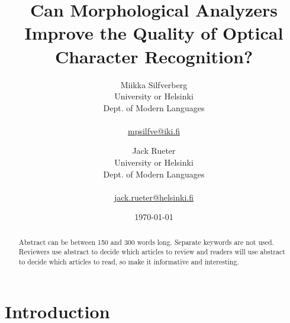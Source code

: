 \documentclass[b5paper]{article}
\begin{document}
\title{Can Morphological Analyzers Improve the Quality of Optical Character Recognition?}

\author{Miikka Silfverberg\\
University or Helsinki\\
Dept. of Modern Languages\\
\\
\url{mpsilfve@iki.fi} \and
Jack Rueter\\
University or Helsinki\\
Dept. of Modern Languages\\
\\
\url{jack.rueter@helsinki.fi} 
}

\date{\today}

\maketitle

\begin{abstract}
    Abstract can be between 150 and 300 words long. Separate keywords are not
    used. Reviewers use abstract to decide which articles to review and readers
    will use abstract to decide which articles to read, so make it informative
    and interesting.
\end{abstract}

\section{Introduction}
\end{document}
